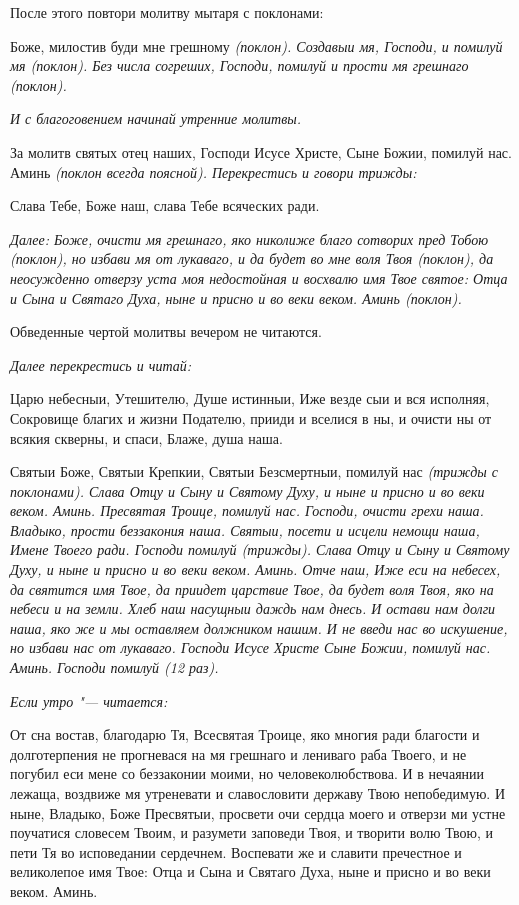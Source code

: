 После этого повтори молитву мытаря с поклонами:


Боже, милостив буди мне грешному \itshape (поклон)\normalfont{}. Создавыи мя, Господи, и помилуй мя \itshape (поклон)\normalfont{}. Без числа согреших, Господи, помилуй и прости мя грешнаго \itshape (поклон)\normalfont{}.


\itshape И с благоговением начинай утренние молитвы.\normalfont{}


За молитв святых отец наших, Господи Исусе Христе, Сыне Божии, помилуй нас. Аминь \itshape (поклон всегда поясной). Перекрестись и говори трижды:\normalfont{}


Слава Тебе, Боже наш, слава Тебе всяческих ради.


\itshape Далее:\normalfont{} Боже, очисти мя грешнаго, яко николиже благо сотворих пред Тобою \itshape (поклон)\normalfont{}, но избави мя от лукаваго, и да будет во мне воля Твоя \itshape (поклон)\normalfont{}, да неосужденно отверзу уста моя недостойная и восхвалю имя Твое святое: Отца и Сына и Святаго Духа, ныне и присно и во веки веком. Аминь \itshape (поклон).\normalfont{}


Обведенные чертой молитвы вечером не читаются.


\itshape Далее перекрестись и читай:\normalfont{}


Царю небесныи, Утешителю, Душе истинныи, Иже везде сыи и вся исполняя, Сокровище благих и жизни Подателю, прииди и вселися в ны, и очисти ны от всякия скверны, и спаси, Блаже, душа наша.


Святыи Боже, Святыи Крепкии, Святыи Безсмертныи, помилуй нас \itshape (трижды с поклонами)\normalfont{}. Слава Отцу и Сыну и Святому Духу, и ныне и присно и во веки веком. Аминь. Пресвятая Троице, помилуй нас. Господи, очисти грехи наша. Владыко, прости беззакония наша. Святыи, посети и исцели немощи наша, Имене Твоего ради. Господи помилуй \itshape (трижды)\normalfont{}. Слава Отцу и Сыну и Святому Духу, и ныне и присно и во веки веком. Аминь. Отче наш, Иже еси на небесех, да святится имя Твое, да приидет царствие Твое, да будет воля Твоя, яко на небеси и на земли. Хлеб наш насущныи даждь нам днесь. И остави нам долги наша, яко же и мы оставляем должником нашим. И не введи нас во искушение, но избави нас от лукаваго. Господи Исусе Христе Сыне Божии, помилуй нас. Аминь. Господи помилуй \itshape (12 раз)\normalfont{}.


\itshape Если утро "--- читается:\normalfont{}


От сна востав, благодарю Тя, Всесвятая Троице, яко многия ради благости и долготерпения не прогневася на мя грешнаго и лениваго раба Твоего, и не погубил еси мене со беззаконии моими, но человеколюбствова. И в нечаянии лежаща, воздвиже мя утреневати и славословити державу Твою непобедимую. И ныне, Владыко, Боже Пресвятыи, просвети очи сердца моего и отверзи ми устне поучатися словесем Твоим, и разумети заповеди Твоя, и творити волю Твою, и пети Тя во исповедании сердечнем. Воспевати же и славити пречестное и великолепое имя Твое: Отца и Сына и Святаго Духа, ныне и присно и во веки веком. Аминь.


